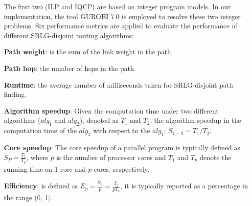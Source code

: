 The first two (ILP and IQCP) are based on integer program models. In our implementation, the tool GUROBI 7.0 \cite{optimization2012gurobi} is employed to resolve these two integer problems.  Six performance metrics are applied to evaluate the performance of different SRLG-disjoint routing algorithms:
%
%

\textbf{Path weight}: is the sum of the link weight in the path.


 \textbf{Path hop}: the number of hops in the path.

\textbf{Runtime}: the average number of milliseconds taken for SRLG-disjoint path finding.


\textbf{Algorithm speedup}: Given the computation time under two different  algorithms ($alg_1$ and $alg_2$), denoted as $T_1$ and $T_2$, the algorithm speedup in the computation time of the $alg_2$ with respect to the $alg_1$: ${S_{1 - 2}} = T_1/T_2$.


 \textbf{Core speedup}: The core speedup \cite{grama2003introduction} of a parallel program is typically defined as $S_P=\frac{T_1}{T_p}$,
where $p$ is the number of processor cores and $T_1$ and $T_p$ denote the running time on 1 core and $p$ cores, respectively.


 \textbf{Efficiency}: is defined \cite{grama2003introduction} as $E_p=\frac{S_p}{p}=\frac{T_1}{pT_p}$,
it is typically reported as a percentage in the range (0, 1].




